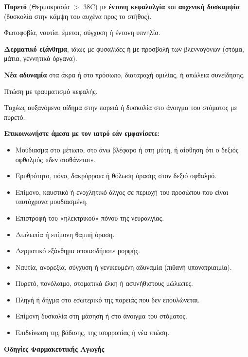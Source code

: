 \documentclass[10pt,greek]{article}
\begin{document}
\begin{UrgentBox}
\item \textbf{Πυρετό} (Θερμοκρασία $>$ 38\textdegree{}C) με \textbf{έντονη κεφαλαλγία} και \textbf{αυχενική δυσκαμψία} (δυσκολία στην κάμψη του αυχένα προς το στήθος).
\item Φωτοφοβία, ναυτία, έμετοι, σύγχυση ή έντονη υπνηλία.
\item \textbf{Δερματικό εξάνθημα}, ιδίως με φυσαλίδες ή με προσβολή των βλεννογόνων (στόμα, μάτια, γεννητικά όργανα).
\item \textbf{Νέα αδυναμία} στα άκρα ή στο πρόσωπο, διαταραχή ομιλίας, ή απώλεια συνείδησης.
\item Πτώση με τραυματισμό κεφαλής.
\item Ταχέως αυξανόμενο οίδημα στην παρειά ή δυσκολία στο άνοιγμα του στόματος με πυρετό.
\end{UrgentBox}

\textbf{Επικοινωνήστε άμεσα με τον ιατρό εάν εμφανίσετε:}
\begin{itemize}
\item Μούδιασμα στο μέτωπο, στο άνω βλέφαρο ή στη μύτη, ή αίσθηση ότι ο δεξιός οφθαλμός «δεν αισθάνεται».
\item Ερυθρότητα, πόνο, δακρύρροια ή θόλωση όρασης στον δεξιό οφθαλμό.
\item Επίμονο, καυστικό ή ενοχλητικό άλγος σε περιοχή του προσώπου που είναι ταυτόχρονα μουδιασμένη.
\item Επιστροφή του «ηλεκτρικού» πόνου της νευραλγίας.
\item Διπλωπία ή επίμονη θαμπή όραση.
\item Δερματικό εξάνθημα οποιασδήποτε μορφής.
\item Ναυτία, ανορεξία, σύγχυση ή γενικευμένη αδυναμία (πιθανή υπονατριαιμία).
\item Πυρετό, πονόλαιμο, στοματικά έλκη ή ασυνήθιστους μώλωπες.
\item Πληγή ή δήγμα στο εσωτερικό της παρειάς που δεν επουλώνεται.
\item Επίμονη δυσκολία στη μάσηση ή στο άνοιγμα του στόματος.
\item Επιδείνωση της βάδισης, της ισορροπίας ή νέα πτώση.
\end{itemize}

\newpage
\begin{center}
\LARGE\textbf{Οδηγίες Φαρμακευτικής Αγωγής}
\end{center}
\vspace{0.5cm}
\end{document}
